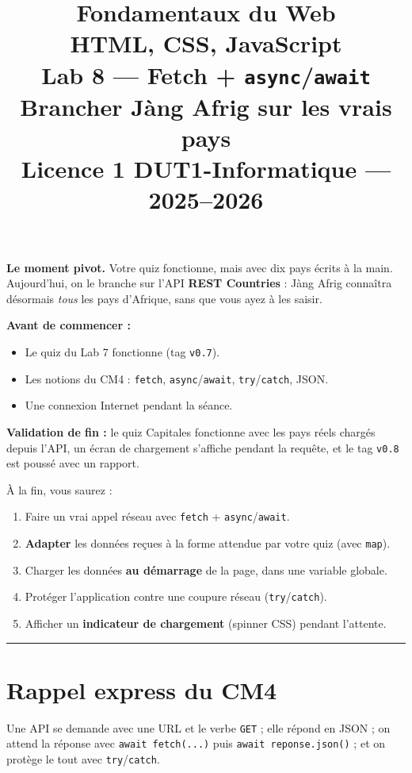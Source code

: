 \documentclass[11pt,a4paper]{article}
\title{%
\vspace{-1cm}
\textbf{\LARGE Fondamentaux du Web}\\
\textbf{\LARGE HTML, CSS, JavaScript}\\[0.8cm]
\textbf{\huge Lab 8 --- Fetch + \texttt{async}/\texttt{await}}\\[0.3cm]
\textbf{\Large Brancher Jàng Afrig sur les vrais pays}\\[0.5cm]
\large Licence 1 DUT1-Informatique --- 2025--2026}
\date{}
\author{}
\newcommand{\code}[1]{\texttt{#1}}
\begin{document}
\maketitle
\thispagestyle{empty}

\begin{prereqbox}
\textbf{Le moment pivot.} Votre quiz fonctionne, mais avec dix pays écrits à la main. Aujourd'hui, on le branche sur l'API \textbf{REST Countries} : Jàng Afrig connaîtra désormais \emph{tous} les pays d'Afrique, sans que vous ayez à les saisir.

\smallskip
\textbf{Avant de commencer :}
\begin{itemize}[leftmargin=*,noitemsep]
  \item Le quiz du Lab 7 fonctionne (tag \code{v0.7}).
  \item Les notions du CM4 : \code{fetch}, \code{async}/\code{await}, \code{try}/\code{catch}, JSON.
  \item Une connexion Internet pendant la séance.
\end{itemize}

\smallskip
\textbf{Validation de fin :} le quiz Capitales fonctionne avec les pays réels chargés depuis l'API, un écran de chargement s'affiche pendant la requête, et le tag \code{v0.8} est poussé avec un rapport.
\end{prereqbox}

\begin{objectifbox}
À la fin, vous saurez :
\begin{enumerate}[leftmargin=*,noitemsep]
  \item Faire un vrai appel réseau avec \code{fetch} + \code{async}/\code{await}.
  \item \textbf{Adapter} les données reçues à la forme attendue par votre quiz (avec \code{map}).
  \item Charger les données \textbf{au démarrage} de la page, dans une variable globale.
  \item Protéger l'application contre une coupure réseau (\code{try}/\code{catch}).
  \item Afficher un \textbf{indicateur de chargement} (spinner CSS) pendant l'attente.
\end{enumerate}
\end{objectifbox}

\tableofcontents
\bigskip\hrule\bigskip

\section*{Rappel express du CM4}
Une API se demande avec une URL et le verbe \code{GET} ; elle répond en JSON ; on attend la réponse avec \code{await fetch(...)} puis \code{await reponse.json()} ; et on protège le tout avec \code{try}/\code{catch}.
\end{document}
